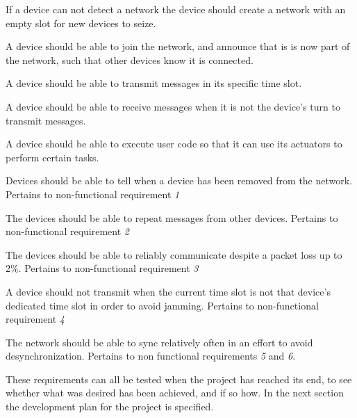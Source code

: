 \begin{eletterate}
    \item If a device can not detect a network the device should create a network with an empty slot for new devices to seize.
    \item A device should be able to join the network, and announce that is is now part of the network, such that other devices know it is connected.
    \item A device should be able to transmit messages in its specific time slot.
    \item A device should be able to receive messages when it is not the device's turn to transmit messages.
    \item A device should be able to execute user code so that it can use its actuators to perform certain tasks.
    \item \label{funcreq:ismissing} Devices should be able to tell when a device has been removed from the network. Pertains to non-functional requirement \textit{1}
    \item \label{funcreq:repeat} The devices should be able to repeat messages from other devices. Pertains to non-functional requirement \textit{2}
    \item The devices should be able to reliably communicate despite a packet loss up to 2\%. Pertains to non-functional requirement \textit{3} 
    \item A device should not transmit when the current time slot is not that device's dedicated time slot in order to avoid jamming. Pertains to non-functional requirement \textit{4}
    \item The network should be able to sync relatively often in an effort to avoid desynchronization. Pertains to non functional requirements \textit{5} and \textit{6}.
\end{eletterate}
\noindent
These requirements can all be tested when the project has reached its end, to see whether what was desired has been achieved, and if so how. 
In the next section the development plan for the project is specified.

